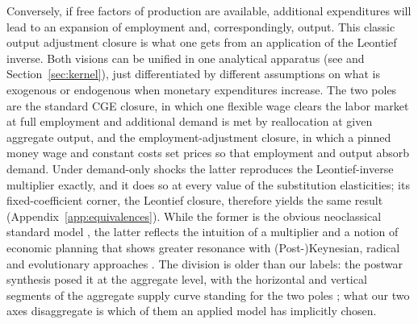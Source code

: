 Conversely, if free factors of production are available, additional expenditures will lead to an expansion of employment and, correspondingly, output. This classic output adjustment closure \citep{Taylor1990} is what one gets from an application of the Leontief inverse. Both visions can be unified in one analytical apparatus (see \citealp{Robinson.2006} and Section~\ref{sec:kernel}), just differentiated by different assumptions on what is exogenous or endogenous when monetary expenditures increase. The two poles are the standard CGE closure, in which one flexible wage clears the labor market at full employment and additional demand is met by reallocation at given aggregate output, and the employment-adjustment closure, in which a pinned money wage and constant costs set prices so that employment and output absorb demand. Under demand-only shocks the latter reproduces the Leontief-inverse multiplier exactly, and it does so at every value of the substitution elasticities; its fixed-coefficient corner, the Leontief closure, therefore yields the same result (Appendix~\ref{app:equivalences}). While the former is the obvious neoclassical standard model \citep[see][]{Sen1963, TaylorLysy1979}, the latter reflects the intuition of a multiplier and a notion of economic planning that shows greater resonance with (Post-)Keynesian, radical and evolutionary approaches \citep{Pollin.2015,Mazzucato.2018}. The division is older than our labels: the postwar synthesis posed it at the
aggregate level, with the horizontal and vertical segments of the aggregate
supply curve standing for the two poles \citep{Hicks.1937,Modigliani.1944};
what our two axes disaggregate is which of them an applied model has
implicitly chosen.


